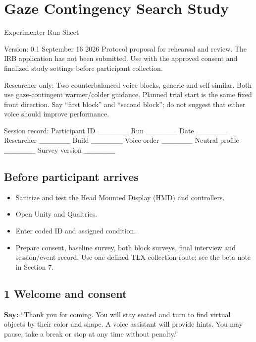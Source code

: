 \section{Gaze Contingency Search
Study}\label{gaze-contingency-search-study}

Experimenter Run Sheet

Version: 0.1 \textbar{} September 16 2026 \textbar{} Protocol proposal
for rehearsal and review. The IRB application has not been submitted.
Use with the approved consent and finalized study settings before
participant collection.

Researcher only: Two counterbalanced voice blocks, generic and
self-similar. Both use gaze-contingent warmer/colder guidance. Planned
trial start is the same fixed front direction. Say ``first block'' and
``second block''; do not suggest that either voice should improve
performance.

Session record: Participant ID \_\_\_\_\_\_ Run \_\_\_\_\_\_ Date
\_\_\_\_\_\_ Researcher \_\_\_\_\_\_ Build \_\_\_\_\_\_ Voice order
\_\_\_\_\_\_ Neutral profile \_\_\_\_\_\_ Survey version \_\_\_\_\_\_

\subsection{Before participant
arrives}\label{before-participant-arrives}

\begin{itemize}
\item
  Sanitize and test the Head Mounted Display (HMD) and controllers.
\item
  Open Unity and Qualtrics.
\item
  Enter coded ID and assigned condition.
\item
  Prepare consent, baseline survey, both block surveys, final interview
  and session/event record. Use one defined TLX collection route; see
  the beta note in Section 7.
\end{itemize}

\subsection{1 Welcome and consent}\label{welcome-and-consent}

\textbf{Say:} ``Thank you for coming. You will stay seated and turn to find
virtual objects by their color and shape. A voice assistant will provide
hints. You may pause, take a break or stop at any time without
penalty.''

